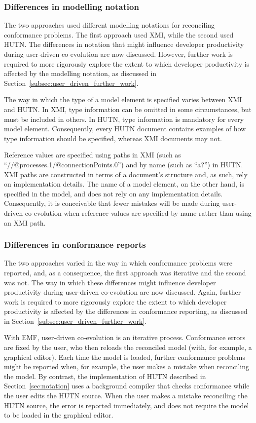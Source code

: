 \subsubsection{Differences in modelling notation}
The two approaches used different modelling notations for reconciling conformance problems. The first approach used XMI, while the second used HUTN. The differences in notation that might influence developer productivity during user-driven co-evolution are now discussed. However, further work is required to more rigorously explore the extent to which developer productivity is affected by the modelling notation, as discussed in Section~\ref{subsec:user_driven_further_work}.

The way in which the type of a model element is specified varies between XMI and HUTN. In XMI, type information can be omitted in some circumstances, but must be included in others. In HUTN, type information is mandatory for every model element. Consequently, every HUTN document contains examples of how type information should be specified, whereas XMI documents may not. 

Reference values are specified using paths in XMI (such as ``//@processes.1/@connectionPoints.0'') and by name (such as ``a?'') in HUTN. XMI paths are constructed in terms of a document's structure and, as such, rely on implementation details. The name of a model element, on the other hand, is specified in the model, and does not rely on any implementation details. Consequently, it is conceivable that fewer mistakes will be made during user-driven co-evolution when reference values are specified by name rather than using an XMI path.

\subsubsection{Differences in conformance reports}
The two approaches varied in the way in which conformance problems were reported, and, as a consequence, the first approach was iterative and the second was not. The way in which these differences might influence developer productivity during user-driven co-evolution are now discussed. Again, further work is required to more rigorously explore the extent to which developer productivity is affected by the differences in conformance reporting, as discussed in Section~\ref{subsec:user_driven_further_work}.

With EMF, user-driven co-evolution is an iterative process. Conformance errors are fixed by the user, who then reloads the reconciled model (with, for example, a graphical editor). Each time the model is loaded, further conformance problems might be reported when, for example, the user makes a mistake when reconciling the model. By contrast, the implementation of HUTN described in Section~\ref{sec:notation} uses a background compiler that checks conformance while the user edits the HUTN source. When the user makes a mistake reconciling the HUTN source, the error is reported immediately, and does not require the model to be loaded in the graphical editor.

